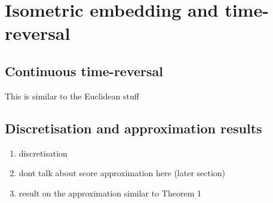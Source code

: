 \section{Isometric embedding and time-reversal}
\label{sec:isom-embedd-time}

\subsection{Continuous time-reversal}
\label{sec:cont-time-revers}

This is similar to the Euclidean stuff

\subsection{Discretisation and approximation results}
\label{sec:discr-appr-rates}

\begin{enumerate}
\item discretisation
\item dont talk about score approximation here (later section)
\item result on the approximation similar to Theorem 1
\end{enumerate}

